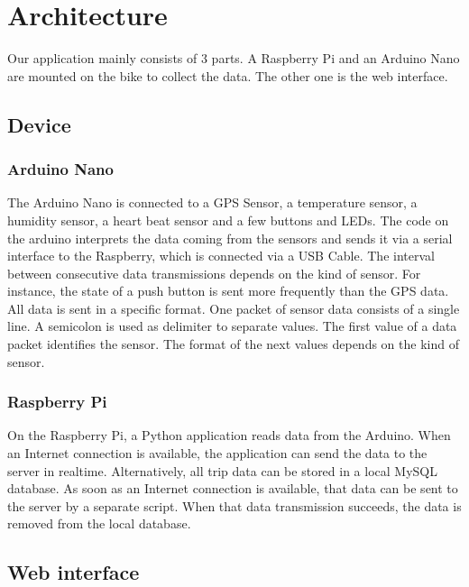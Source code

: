 \section{Architecture}
Our application mainly consists of 3 parts. 
A Raspberry Pi and an Arduino Nano are mounted on the bike to collect the data. 
The other one is the web interface.
\subsection{Device}
\subsubsection{Arduino Nano}
The Arduino Nano is connected to a GPS Sensor, a temperature sensor, a humidity sensor, a heart beat sensor and a few buttons and LEDs. 
The code on the arduino interprets the data coming from the sensors and sends it via a serial interface to the Raspberry, which is connected via a USB Cable.
The interval between consecutive data transmissions depends on the kind of sensor. 
For instance, the state of a push button is sent more frequently than the GPS data.
All data is sent in a specific format. One packet of sensor data consists of a single line.
A semicolon is used as delimiter to separate values. The first value of a data packet identifies the sensor. 
The format of the next values depends on the kind of sensor.
\subsubsection{Raspberry Pi}
On the Raspberry Pi, a Python application reads data from the Arduino. 
When an Internet connection is available, the application can send the data to the server in realtime.
Alternatively, all trip data can be stored in a local MySQL database. 
As soon as an Internet connection is available, that data can be sent to the server by a separate script.
When that data transmission succeeds, the data is removed from the local database.
\subsection{Web interface}

